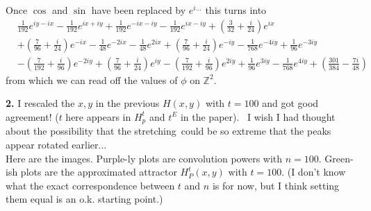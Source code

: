 \documentclass{article}
\theoremstyle{definition}
\newcommand{\nn}{\nonumber}
\begin{document}
Once $\cos$ and $\sin$ have been replaced by $e^{i\dots}$ this turns into
\begin{align}
&\frac{1}{192} e^{i y-i x} -\frac{1}{192} e^{i x+i y} +\frac{1}{192} e^{-i x-i y} -\frac{1}{192} e^{i x-i y}+\left(\frac{3}{32}+\frac{i}{24}\right) e^{i x}\nn\\
&+\left(\frac{7}{96}+\frac{i}{24}\right) e^{-i x}-\frac{1}{48} e^{-2 i x}-\frac{1}{48} e^{2 i x}+\left(\frac{7}{96}+\frac{i}{24}\right) e^{-i y}-\frac{1}{768} e^{-4 i y}+\frac{1}{96} e^{-3 i y}\nn\\
&-\left(\frac{7}{192}+\frac{i}{96}\right) e^{-2 i y}+\left(\frac{7}{96}+\frac{i}{24}\right) e^{i y}-\left(\frac{7}{192}+\frac{i}{96}\right) e^{2 i y}+\frac{1}{96} e^{3 i y}-\frac{1}{768} e^{4 i y}+\left(\frac{301}{384}-\frac{7 i}{48}\right)
\end{align}
from which we can read off the values of $\phi$ on $\mathbb{Z}^2$. 
















\newpage











\noindent \textbf{2.} I rescaled the $x,y$ in the previous $H(x,y)$ with $t = 100$ and got good agreement! ($t$ here appears in $H^t_p$ and $t^E$ in the paper).  I wish I had thought about the possibility that the stretching could be so extreme that the peaks appear rotated earlier...\\

Here are the images. Purple-ly plots are convolution powers with $n = 100$. Green-ish plots are the approximated attractor $H^t_P(x,y)$ with $t = 100$. (I don't know what the exact correspondence between $t$ and $n$ is for now, but I think setting them equal is an o.k. starting point.)
\end{document}

